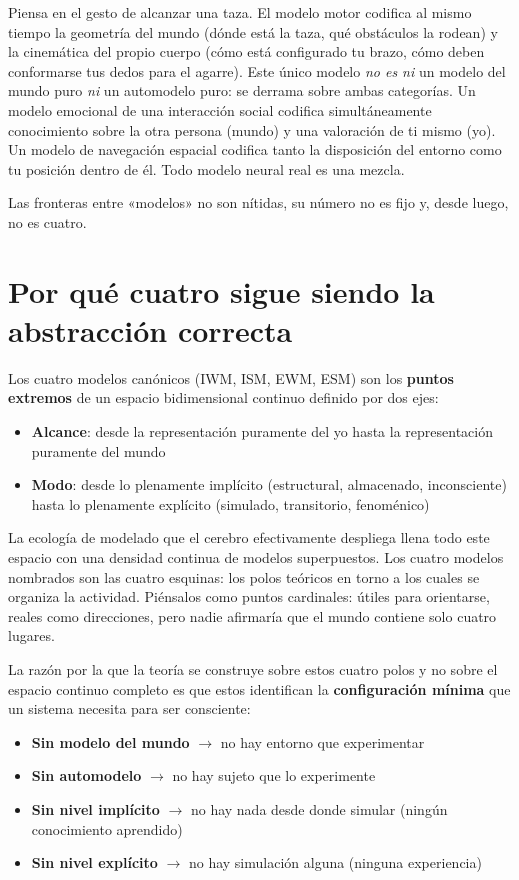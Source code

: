 \documentclass[11pt, twoside, openright]{book}
\begin{document}
Piensa en el gesto de alcanzar una taza. El modelo motor codifica al mismo tiempo la geometría del mundo (dónde está la taza, qué obstáculos la rodean) y la cinemática del propio cuerpo (cómo está configurado tu brazo, cómo deben conformarse tus dedos para el agarre). Este único modelo \textit{no es ni} un modelo del mundo puro \textit{ni} un automodelo puro: se derrama sobre ambas categorías. Un modelo emocional de una interacción social codifica simultáneamente conocimiento sobre la otra persona (mundo) y una valoración de ti mismo (yo). Un modelo de navegación espacial codifica tanto la disposición del entorno como tu posición dentro de él. Todo modelo neural real es una mezcla.

Las fronteras entre «modelos» no son nítidas, su número no es fijo y, desde luego, no es cuatro.

\section*{Por qué cuatro sigue siendo la abstracción correcta}

Los cuatro modelos canónicos (IWM, ISM, EWM, ESM) son los \textbf{puntos extremos} de un espacio bidimensional continuo definido por dos ejes:

\begin{itemize}
  \item \textbf{Alcance}: desde la representación puramente del yo hasta la representación puramente del mundo
  \item \textbf{Modo}: desde lo plenamente implícito (estructural, almacenado, inconsciente) hasta lo plenamente explícito (simulado, transitorio, fenoménico)
\end{itemize}

La ecología de modelado que el cerebro efectivamente despliega llena todo este espacio con una densidad continua de modelos superpuestos. Los cuatro modelos nombrados son las cuatro esquinas: los polos teóricos en torno a los cuales se organiza la actividad. Piénsalos como puntos cardinales: útiles para orientarse, reales como direcciones, pero nadie afirmaría que el mundo contiene solo cuatro lugares.

La razón por la que la teoría se construye sobre estos cuatro polos y no sobre el espacio continuo completo es que estos identifican la \textbf{configuración mínima} que un sistema necesita para ser consciente:

\begin{itemize}
  \item \textbf{Sin modelo del mundo} $\rightarrow$ no hay entorno que experimentar
  \item \textbf{Sin automodelo} $\rightarrow$ no hay sujeto que lo experimente
  \item \textbf{Sin nivel implícito} $\rightarrow$ no hay nada desde donde simular (ningún conocimiento aprendido)
  \item \textbf{Sin nivel explícito} $\rightarrow$ no hay simulación alguna (ninguna experiencia)
\end{itemize}
\end{document}
